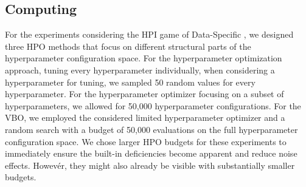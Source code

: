 \documentclass[letterpaper]{article} %
\begin{document}
\subsection{Computing \opthabit}
For the experiments considering the HPI game of Data-Specific \opthabit, we designed three HPO methods that focus on different structural parts of the hyperparameter configuration space. For the hyperparameter optimization approach, tuning every hyperparameter individually, when considering a hyperparameter for tuning, we sampled 50 random values for every hyperparameter. For the hyperparameter optimizer focusing on a subset of hyperparameters, we allowed for 50,000 hyperparameter configurations. For the VBO, we employed the considered limited hyperparameter optimizer and a random search with a budget of 50,000 evaluations on the full hyperparameter configuration space. We chose larger HPO budgets for these experiments to immediately ensure the built-in deficiencies become apparent and reduce noise effects. Howevér, they might also already be visible with substantially smaller budgets.
\end{document}
